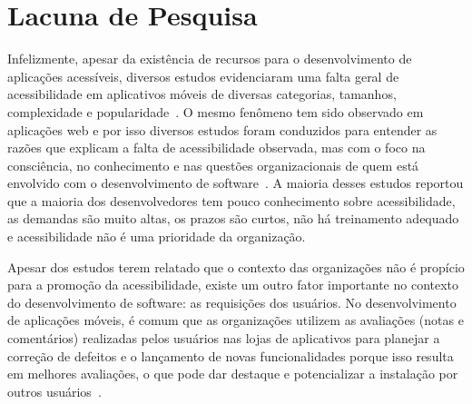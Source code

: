 


\section{Lacuna de Pesquisa}

Infelizmente, 
apesar da existência de recursos para o desenvolvimento de aplicações acessíveis, 
diversos estudos evidenciaram uma falta geral de acessibilidade em aplicativos móveis de diversas categorias, tamanhos, complexidade e popularidade~\cite{serra2015accessibility,eler2018mate,Yan2019currentstatus,Vendome2019,Alshayban2020,AcostaVargas2020}.
O mesmo fenômeno tem sido observado em aplicações web e por isso diversos estudos foram conduzidos para entender as razões que explicam a falta de acessibilidade observada, mas com o foco na consciência, no conhecimento e nas questões organizacionais de quem está envolvido com o desenvolvimento de software~\cite{  
lazar2004improving,Freire2008survey,oliveira2017strategies,Inal2019,barzilai2008factors,Putnam:2012}. 
A maioria desses estudos reportou que a maioria dos desenvolvedores tem pouco conhecimento sobre acessibilidade, as demandas são muito altas, os prazos são curtos, não há treinamento adequado e acessibilidade não é uma prioridade da organização.

Apesar dos estudos terem relatado que o contexto das organizações não é propício para a promoção da acessibilidade, existe um outro fator importante no contexto do desenvolvimento de software: as requisições dos usuários. 
No desenvolvimento de aplicações móveis, 
é comum que as organizações utilizem as avaliações (notas e comentários) realizadas pelos usuários nas lojas de aplicativos para planejar a correção de defeitos e o lançamento de novas funcionalidades porque isso resulta em melhores avaliações, o que pode dar destaque e potencializar a instalação por outros usuários~\cite{nayebi,Palomba2015userreviews,Palomba2018crowdsourcing,Li2018MobileAE,Ciurumelea2017analyzing,Ortega2015thesis}.

